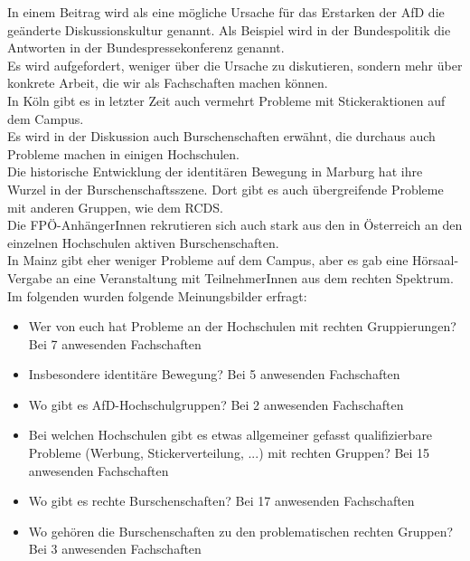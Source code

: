     In einem Beitrag wird als eine mögliche Ursache für das Erstarken der AfD die geänderte Diskussionskultur genannt. Als Beispiel wird in der Bundespolitik die Antworten in der Bundespressekonferenz genannt. \\

    Es wird aufgefordert, weniger über die Ursache zu diskutieren, sondern mehr über konkrete Arbeit, die wir als Fachschaften machen können. \\

    In Köln gibt es in letzter Zeit auch vermehrt Probleme mit Stickeraktionen auf dem Campus. \\

    Es wird in der Diskussion auch Burschenschaften erwähnt, die durchaus auch Probleme machen in einigen Hochschulen. \\

    Die historische Entwicklung der identitären Bewegung in Marburg hat ihre Wurzel in der Burschenschaftsszene. Dort gibt es auch übergreifende Probleme mit anderen Gruppen, wie dem RCDS. \\

    Die FPÖ-AnhängerInnen rekrutieren sich auch stark aus den in Österreich an den einzelnen Hochschulen aktiven Burschenschaften. \\

    In Mainz gibt eher weniger Probleme auf dem Campus, aber es gab eine Hörsaal-Vergabe an eine Veranstaltung mit TeilnehmerInnen aus dem rechten Spektrum. \\

    Im folgenden wurden folgende Meinungsbilder erfragt:

    \begin{itemize}
      \item Wer von euch hat Probleme an der Hochschulen mit rechten Gruppierungen? Bei 7 anwesenden Fachschaften
      \item Insbesondere identitäre Bewegung? Bei 5 anwesenden Fachschaften
      \item Wo gibt es AfD-Hochschulgruppen? Bei 2 anwesenden Fachschaften
      \item Bei welchen Hochschulen gibt es etwas allgemeiner gefasst qualifizierbare Probleme (Werbung, Stickerverteilung, ...) mit rechten Gruppen? Bei 15 anwesenden Fachschaften
      \item Wo gibt es rechte Burschenschaften? Bei 17 anwesenden Fachschaften
      \item Wo gehören die Burschenschaften zu den problematischen rechten Gruppen? Bei 3 anwesenden Fachschaften
    \end{itemize}

